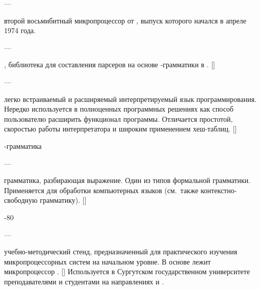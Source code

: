 \stopxrow

\startxrow

\startxcell[align=flushright]
\stopxcell

\startxcell[align=center]
---
\stopxcell

\startxcell[align={width, bottom, fullhz, hanging}]
второй восьмибитный микропроцессор от , выпуск которого начался в
апреле 1974 года.
\stopxcell

\stopxrow

\startxrow

\startxcell[align=flushright]
\stopxcell

\startxcell[align=center]
---
\stopxcell

\startxcell[align={width, bottom, fullhz, hanging}]
, библиотека для составления парсеров на
основе -грамматики в . []
\stopxcell

\stopxrow

\startxrow

\startxcell[align=flushright]
\stopxcell

\startxcell[align=center]
---
\stopxcell

\startxcell[align={width, bottom, fullhz, hanging}]
легко встраиваемый и расширяемый интерпретируемый язык программирования.
Нередко используется в полноценных программных решениях как способ пользователю
расширить функционал программы. Отличается простотой, скоростью работы
интерпретатора и широким применением хеш-таблиц. []
\stopxcell

\stopxrow

\startxrow

\startxcell[align=flushright]
-грамматика
\stopxcell

\startxcell[align=center]
---
\stopxcell

\startxcell[align={width, bottom, fullhz, hanging}]
грамматика, разбирающая выражение. Один из типов формальной грамматики.
Применяется для обработки компьютерных языков (см.\ также контекстно-свободную
грамматику). []
\stopxcell

\stopxrow

\startxrow

\startxcell[align=flushright]
-80
\stopxcell

\startxcell[align=center]
---
\stopxcell

\startxcell[align={width, bottom, fullhz, hanging}]
учебно-методический стенд, предназначенный для практического изучения
микропроцессорных систем на начальном уровне. В основе лежит микропроцессор
. [] Используется в Сургутском
государственном университете преподавателями и студентами на направлениях
 и .
\stopxcell

